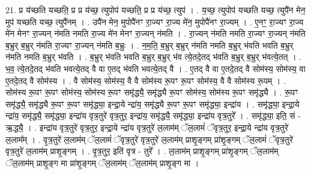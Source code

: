 \documentclass[17pt]{extarticle}
\begin{document}
21. प्र य॑च्छति यच्छति॒ प्र प्र य॑च्छ॒ त्युपोप॑ यच्छति॒ प्र प्र य॑च्छ॒ त्युप॑ । . य॒च्छ॒ त्युपोप॑ यच्छति यच्छ॒ त्युपै॑न मेन॒ मुप॑ यच्छति यच्छ॒ त्युपै॑नम् । . उपै॑न मेन॒ मुपोपै॑नꣳ रा॒ज्यꣳ रा॒ज्य मे॑न॒ मुपोपै॑नꣳ रा॒ज्यम् । . ए॒नꣳ॒॒ रा॒ज्यꣳ रा॒ज्य मे॑न मेनꣳ रा॒ज्यन् न॑मति नमति रा॒ज्य मे॑न मेनꣳ रा॒ज्यन् न॑मति । . रा॒ज्यन् न॑मति नमति रा॒ज्यꣳ रा॒ज्यन् न॑मति ब॒भ्रुर् ब॒भ्रुर् न॑मति रा॒ज्यꣳ रा॒ज्यन् न॑मति ब॒भ्रुः । . न॒म॒ति॒ ब॒भ्रुर् ब॒भ्रुर् न॑मति नमति ब॒भ्रुर् भ॑वति भवति ब॒भ्रुर् न॑मति नमति ब॒भ्रुर् भ॑वति । . ब॒भ्रुर् भ॑वति भवति ब॒भ्रुर् ब॒भ्रुर् भ॑व त्ये॒तदे॒तद् भ॑वति ब॒भ्रुर् ब॒भ्रुर् भ॑वत्ये॒तत् । . भ॒व॒ त्ये॒तदे॒तद् भ॑वति भवत्ये॒तद् वै वा ए॒तद् भ॑वति भवत्ये॒तद् वै । . ए॒तद् वै वा ए॒तदे॒तद् वै सोम॑स्य॒ सोम॑स्य॒ वा ए॒तदे॒तद् वै सोम॑स्य । . वै सोम॑स्य॒ सोम॑स्य॒ वै वै सोम॑स्य रू॒पꣳ रू॒पꣳ सोम॑स्य॒ वै वै सोम॑स्य रू॒पम् । . सोम॑स्य रू॒पꣳ रू॒पꣳ सोम॑स्य॒ सोम॑स्य रू॒पꣳ समृ॑द्ध्यै॒ समृ॑द्ध्यै रू॒पꣳ सोम॑स्य॒ सोम॑स्य रू॒पꣳ समृ॑द्ध्यै । . रू॒पꣳ समृ॑द्ध्यै॒ समृ॑द्ध्यै रू॒पꣳ रू॒पꣳ समृ॑द्ध्या॒ इन्द्रा॒ये न्द्रा॑य॒ समृ॑द्ध्यै रू॒पꣳ रू॒पꣳ समृ॑द्ध्या॒ इन्द्रा॑य । . समृ॑द्ध्या॒ इन्द्रा॒ये न्द्रा॑य॒ समृ॑द्ध्यै॒ समृ॑द्ध्या॒ इन्द्रा॑य वृत्र॒तुरे॑ वृत्र॒तुर॒ इन्द्रा॑य॒ समृ॑द्ध्यै॒ समृ॑द्ध्या॒ इन्द्रा॑य वृत्र॒तुरे᳚ । . समृ॑द्ध्या॒ इति॒ सं - ऋ॒द्ध्यै॒ । . इन्द्रा॑य वृत्र॒तुरे॑ वृत्र॒तुर॒ इन्द्रा॒ये न्द्रा॑य वृत्र॒तुरे॑ ल॒लाम॑म् ॅल॒लामं॑ ॅवृत्र॒तुर॒ इन्द्रा॒ये न्द्रा॑य वृत्र॒तुरे॑ ल॒लाम᳚म् । . वृ॒त्र॒तुरे॑ ल॒लाम॑म् ॅल॒लामं॑ ॅवृत्र॒तुरे॑ वृत्र॒तुरे॑ ल॒लाम॑म् प्राशृ॒ङ्गम् प्रा॑शृ॒ङ्गम् ॅल॒लामं॑ ॅवृत्र॒तुरे॑ वृत्र॒तुरे॑ ल॒लाम॑म् प्राशृ॒ङ्गम् । . वृ॒त्र॒तुर॒ इति॑ वृत्र - तुरे᳚ । . ल॒लाम॑म् प्राशृ॒ङ्गम् प्रा॑शृ॒ङ्गम् ॅल॒लाम॑म् ॅल॒लाम॑म् प्राशृ॒ङ्ग मा प्रा॑शृ॒ङ्गम् ॅल॒लाम॑म् ॅल॒लाम॑म् प्राशृ॒ङ्ग मा । \newline
\end{document}
